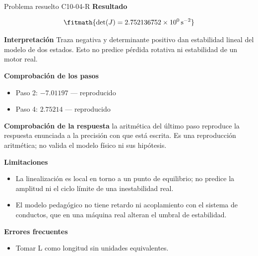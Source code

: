 \documentclass[10pt,openany]{book}
\begin{document}
\begin{studiumworked}{Problema resuelto C10-04-R}
\noindent\textbf{Resultado}

\[
\fitmath{\det(J)=2.752136752\times10^{0}\,\mathrm{s}^{-2}}
\]

\noindent\textbf{Interpretación}
Traza negativa y determinante positivo dan estabilidad lineal del modelo de dos estados. Esto no predice pérdida rotativa ni estabilidad de un motor real.

\noindent\textbf{Comprobación de los pasos}
\begin{itemize}
\item Paso 2: $-7.01197$ — reproducido
\item Paso 4: $2.75214$ — reproducido
\end{itemize}

\noindent\textbf{Comprobación de la respuesta} la aritmética del último paso reproduce la respuesta enunciada a la precisión con que está escrita. Es una reproducción aritmética; no valida el modelo físico ni sus hipótesis.

\noindent\textbf{Limitaciones}
\begin{itemize}
\item La linealización es local en torno a un punto de equilibrio; no predice la amplitud ni el ciclo límite de una inestabilidad real.
\item El modelo pedagógico no tiene retardo ni acoplamiento con el sistema de conductos, que en una máquina real alteran el umbral de estabilidad.
\end{itemize}

\noindent\textbf{Errores frecuentes}
\begin{itemize}
\item Tomar L como longitud sin unidades equivalentes.
\end{itemize}
\end{studiumworked}
\end{document}
